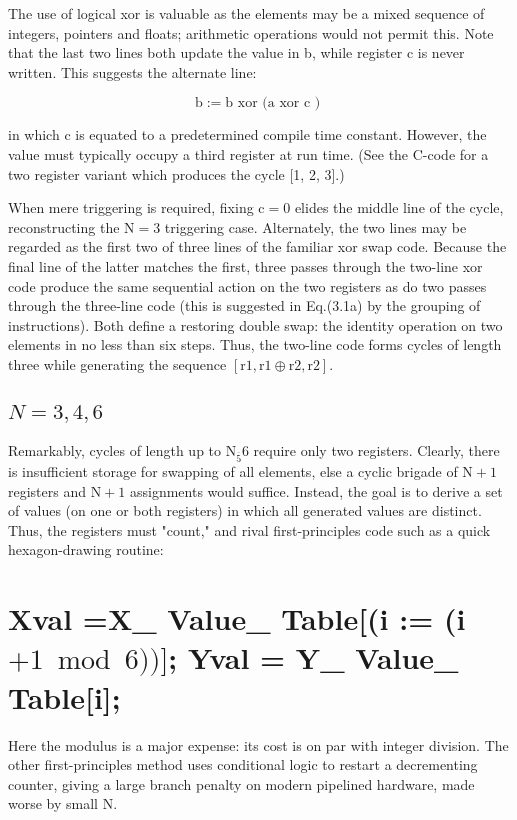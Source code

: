 \begin{CJK}{UTF8}{gbsn}
The use of logical xor is valuable as the elements may be a mixed sequence of integers, pointers and floats; arithmetic operations would not permit this. Note that the last two lines both update the value in b, while register c is never written. This suggests the alternate line:

$$
\mathrm{b}:=\mathrm{b} \text { xor (a xor } \mathrm{c} \text { ) }
$$

in which $\mathrm{c}$ is equated to a predetermined compile time constant. However, the value must typically occupy a third register at run time. (See the C-code for a two register variant which produces the cycle [1, 2, 3].)


When mere triggering is required, fixing $\mathrm{c}=0$ elides the middle line of the cycle, reconstructing the $\mathrm{N}=3$ triggering case. Alternately, the two lines may be regarded as the first two of three lines of the familiar xor swap code. Because the final line of the latter matches the first, three passes through the two-line xor code produce the same sequential action on the two registers as do two passes through the three-line code (this is suggested in Eq.(3.1a) by the grouping of instructions). Both define a restoring double swap: the identity operation on two elements in no less than six steps. Thus, the two-line code forms cycles of length three while generating the sequence $[\mathrm{r} 1, \mathrm{r} 1 \oplus \mathrm{r} 2, \mathrm{r} 2]$.

\subsection*{$N=3,4,6$}

Remarkably, cycles of length up to $\mathrm{N}_{\overline{5}} 6$ require only two registers. Clearly, there is insufficient storage for swapping of all elements, else a cyclic brigade of $\mathrm{N}+1$ registers and $\mathrm{N}+1$ assignments would suffice. Instead, the goal is to derive a set of values (on one or both registers) in which all generated values are distinct. Thus, the registers must "count," and rival first-principles code such as a quick hexagon-drawing routine:

\section{Xval =X\_ Value\_ Table[(i := (i $+1 \bmod 6))]$; 
 Yval = Y\_ Value\_ Table[i];}
Here the modulus is a major expense: its cost is on par with integer division. The other first-principles method uses conditional logic to restart a decrementing counter, giving a large branch penalty on modern pipelined hardware, made worse by small N.


\end{CJK}
